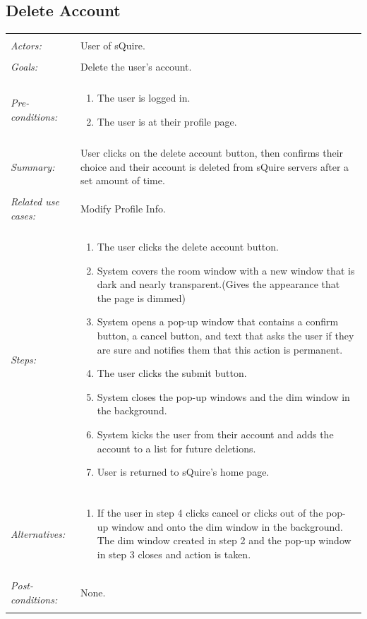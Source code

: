 \documentclass[11pt]{report}
\begin{document}
\subsection{Delete Account}
\begin{tabular}{ p{2cm} p{12cm} }
 \hline
 \\
 \textit{Actors:} & User of sQuire. \\ 
 \\
 \textit{Goals:} & Delete the user's account. \\
 \\
 \textit{Pre-conditions:} & \begin{enumerate}
  \item The user is logged in.
  \item The user is at their profile page.
 \end{enumerate} \\
 \\
 \textit{Summary:} & User clicks on the delete account button, then confirms their choice and their account is deleted from sQuire servers after a set amount of time.\\ 
 \\
 \textit{Related use cases:} & Modify Profile Info. \\ 
 \\
 \textit{Steps:} & \begin{enumerate}
  \item The user clicks the delete account button.
  \item System covers the room window with a new window that is dark and nearly transparent.(Gives the appearance that the page is dimmed) 
  \item System opens a pop-up window that contains a confirm button, a cancel button, and text that asks the user if they are sure and notifies them that this action is permanent.
  \item The user clicks the submit button.
  \item System closes the pop-up windows and the dim window in the background.
  \item System kicks the user from their account and adds the account to a list for future deletions.
  \item User is returned to sQuire's home page.
 \end{enumerate} \\
 \\
 \textit{Alternatives:} & \begin{enumerate} 
  \item If the user in step 4 clicks cancel or clicks out of the pop-up window and onto the dim window in the background. The dim window created in step 2 and the pop-up window in step 3 closes and action is taken.
 \end{enumerate} \\
 \\
 \textit{Post-conditions:} & None. \\
 \\
\hline
\end{tabular}
\end{document}
